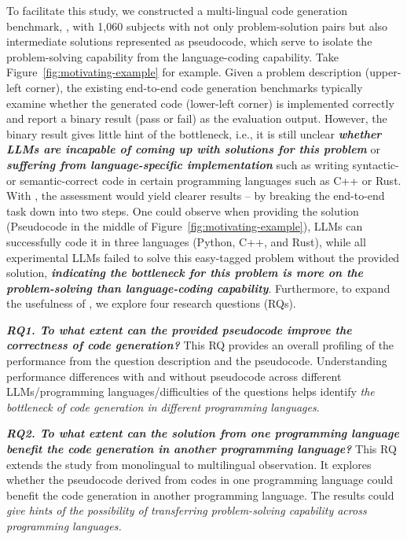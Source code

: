 To facilitate this study, we constructed a multi-lingual code generation benchmark, \name, with 1,060 subjects with not only problem-solution pairs but also intermediate solutions represented as pseudocode, which serve to isolate the problem-solving capability from the language-coding capability.
Take Figure~\ref{fig:motivating-example} for example. Given a problem description (upper-left corner), the existing end-to-end code generation benchmarks typically examine whether the generated code (lower-left corner) is implemented correctly and report a binary result (pass or fail) as the evaluation output.
However, the binary result gives little hint of the bottleneck, i.e., it is still unclear \textbf{\textit{whether LLMs are incapable of coming up with solutions for this problem}} or \textbf{\textit{\textbf{suffering from language-specific implementation}}} such as writing syntactic- or semantic-correct code in certain programming languages such as C++ or Rust. With \name, the assessment would yield clearer results -- by breaking the end-to-end task down into two steps.
One could observe when providing the solution (Pseudocode in the middle of Figure~\ref{fig:motivating-example}), LLMs can successfully code it in three languages (Python, C++, and Rust),
while all experimental LLMs failed to solve this easy-tagged problem without the provided solution,
\textbf{\textit{indicating the bottleneck for this problem is more on the problem-solving than language-coding capability}}. Furthermore, to expand the usefulness of \name, we explore four research questions (RQs). 

\textbf{\textit{RQ1. To what extent can the provided pseudocode improve the correctness of code generation?}} This RQ provides an overall profiling of the performance from the question description and the pseudocode. Understanding performance differences with and without pseudocode across different LLMs/programming languages/difficulties of the questions helps identify \textit{the bottleneck of code generation in different programming languages}. 

\textit{\textbf{RQ2. To what extent can the solution from one programming language benefit the code generation in another programming language?}} This RQ extends the study from monolingual to multilingual observation. It explores whether the pseudocode derived from codes in one programming language could benefit the code generation in another programming language. The results could \textit{give hints of the possibility of transferring problem-solving capability across programming languages.}

